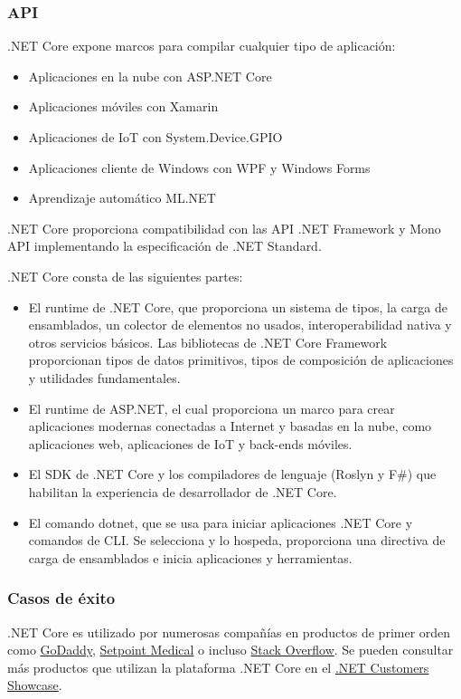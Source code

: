 \subsubsection{API}
.NET Core expone marcos para compilar cualquier tipo de aplicación:
\begin{itemize}
\item Aplicaciones en la nube con ASP.NET Core
\item Aplicaciones móviles con Xamarin
\item Aplicaciones de IoT con System.Device.GPIO
\item Aplicaciones cliente de Windows con WPF y Windows Forms
\item Aprendizaje automático ML.NET
\end{itemize}

.NET Core proporciona compatibilidad con las API .NET Framework y Mono API implementando la especificación de .NET Standard.

.NET Core consta de las siguientes partes:
\begin{itemize}
    \item El runtime de .NET Core, que proporciona un sistema de tipos, la carga de ensamblados, un colector de elementos no usados, interoperabilidad nativa y otros servicios básicos. Las bibliotecas de .NET Core Framework proporcionan tipos de datos primitivos, tipos de composición de aplicaciones y utilidades fundamentales.
    \item El runtime de ASP.NET, el cual proporciona un marco para crear aplicaciones modernas conectadas a Internet y basadas en la nube, como aplicaciones web, aplicaciones de IoT y back-ends móviles.
    \item El SDK de .NET Core y los compiladores de lenguaje (Roslyn y F\#) que habilitan la experiencia de desarrollador de .NET Core.
    \item El comando dotnet, que se usa para iniciar aplicaciones .NET Core y comandos de CLI. Se selecciona y lo hospeda, proporciona una directiva de carga de ensamblados e inicia aplicaciones y herramientas.
\end{itemize}

\subsubsection{Casos de éxito}
.NET Core es utilizado por numerosas compañías en productos de primer orden como \href{https://dotnet.microsoft.com/platform/customers}{GoDaddy}, \href{https://customers.microsoft.com/en-us/story/744483-setpoint-medical-discrete-manufacturing-net}{Setpoint Medical} o incluso \href{https://www.youtube.com/watch?v=1DIDWWKk8Bg&feature=youtu.be}{Stack Overflow}. Se pueden consultar más productos que utilizan la plataforma .NET Core en el \href{https://dotnet.microsoft.com/platform/customers}{.NET Customers Showcase}.

